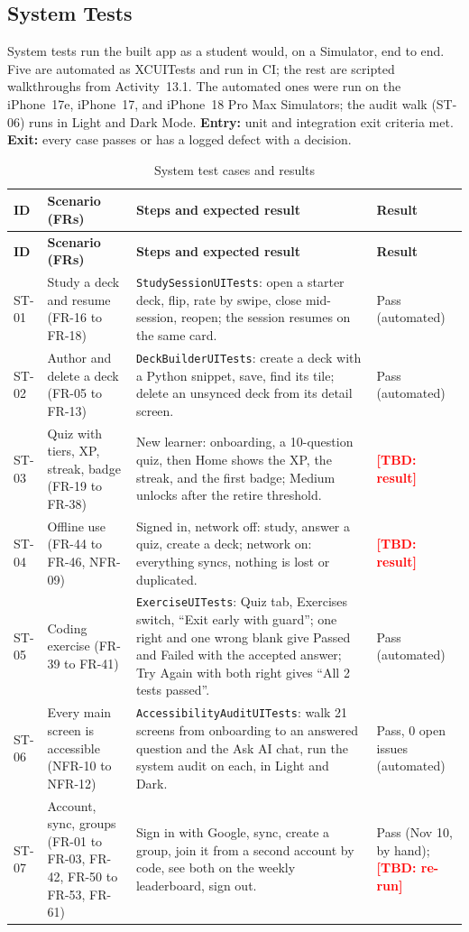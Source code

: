 \documentclass[12pt,letterpaper]{article}
\newcommand{\tbd}[1]{\textcolor{red}{\textbf{[TBD: #1]}}}
\begin{document}
\subsection{System Tests}\label{sec:systemtests}
System tests run the built app as a student would, on a Simulator, end to end.
Five are automated as XCUITests and run in CI; the rest are scripted walkthroughs
from Activity~13.1. The automated ones were run on the iPhone~17e, iPhone~17, and
iPhone~18 Pro Max Simulators; the audit walk (ST-06) runs in Light and Dark Mode.
\textbf{Entry:} unit and integration exit criteria met. \textbf{Exit:} every case
passes or has a logged defect with a decision.

\begin{xltabular}{\textwidth}{@{}L{1.0cm} L{3.0cm} Y L{2.4cm}@{}}
\caption{System test cases and results}\label{tab:systests}\\
\toprule
\textbf{ID} & \textbf{Scenario (FRs)} & \textbf{Steps and expected result} & \textbf{Result} \\
\midrule
\endfirsthead
\toprule
\textbf{ID} & \textbf{Scenario (FRs)} & \textbf{Steps and expected result} & \textbf{Result} \\
\midrule
\endhead
\bottomrule
\endfoot
ST-01 & Study a deck and resume (FR-16 to FR-18) & \texttt{StudySessionUITests}: open a starter deck, flip, rate by swipe, close mid-session, reopen; the session resumes on the same card. & Pass (automated) \\
ST-02 & Author and delete a deck (FR-05 to FR-13) & \texttt{DeckBuilderUITests}: create a deck with a Python snippet, save, find its tile; delete an unsynced deck from its detail screen. & Pass (automated) \\
ST-03 & Quiz with tiers, XP, streak, badge (FR-19 to FR-38) & New learner: onboarding, a 10-question quiz, then Home shows the XP, the streak, and the first badge; Medium unlocks after the retire threshold. & \tbd{result} \\
ST-04 & Offline use (FR-44 to FR-46, NFR-09) & Signed in, network off: study, answer a quiz, create a deck; network on: everything syncs, nothing is lost or duplicated. & \tbd{result} \\
ST-05 & Coding exercise (FR-39 to FR-41) & \texttt{ExerciseUITests}: Quiz tab, Exercises switch, ``Exit early with guard''; one right and one wrong blank give Passed and Failed with the accepted answer; Try Again with both right gives ``All 2 tests passed''. & Pass (automated) \\
ST-06 & Every main screen is accessible (NFR-10 to NFR-12) & \texttt{AccessibilityAuditUITests}: walk 21 screens from onboarding to an answered question and the Ask AI chat, run the system audit on each, in Light and Dark. & Pass, 0 open issues (automated) \\
ST-07 & Account, sync, groups (FR-01 to FR-03, FR-42, FR-50 to FR-53, FR-61) & Sign in with Google, sync, create a group, join it from a second account by code, see both on the weekly leaderboard, sign out. & Pass (Nov 10, by hand); \tbd{re-run} \\
\end{xltabular}
\end{document}
